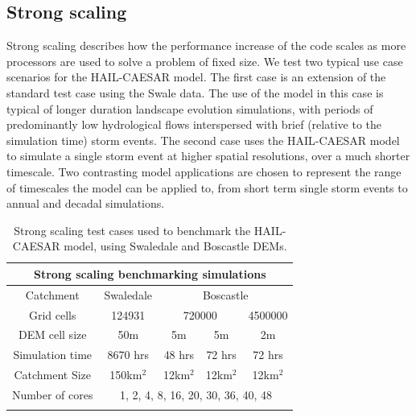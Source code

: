 \subsection{Strong scaling}
Strong scaling describes how the performance increase of the code scales as more processors are used to solve a problem of fixed size. We test two typical use case scenarios for the HAIL-CAESAR model. The first case is an extension of the standard test case using the Swale data. The use of the model in this case is typical of longer duration landscape evolution simulations, with periods of predominantly low hydrological flows interspersed with brief (relative to the simulation time) storm events. The second case uses the HAIL-CAESAR model to simulate a single storm event at higher spatial resolutions, over a much shorter timescale. Two contrasting model applications are chosen to represent the range of timescales the model can be applied to, from short term single storm events to annual and decadal simulations. 

\begin{table}
\caption{Strong scaling test cases used to benchmark the HAIL-CAESAR model, using Swaledale and Boscastle DEMs.}
\begin{tabular}{ccccc}
\\
\multicolumn{5}{c}{\textbf{Strong scaling benchmarking simulations}} \\
\hline 
Catchment & Swaledale & \multicolumn{3}{c}{Boscastle} \\
Grid cells & 124931 & \multicolumn{2}{c}{720000} & 4500000 \\ 
DEM cell size & 50m & 5m & 5m & 2m \\ 
Simulation time & 8670 hrs & 48 hrs & 72 hrs & 72 hrs \\ 
Catchment Size & 150km$^2$ & {12km$^2$} & {12km$^2$} & {12km$^2$} \\ 
Number of cores & \multicolumn{4}{c}{1, 2, 4, 8, 16, 20, 30, 36, 40, 48} \\ 
\hline \\
\end{tabular} 
\label{strong_scale_table}
\end{table}

